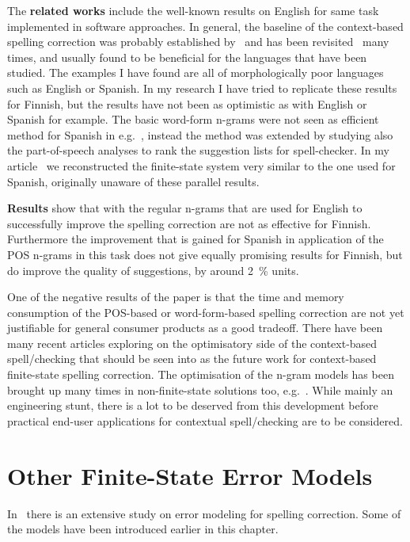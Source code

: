 \documentclass[officiallayout]{unihelcompling}
\begin{document}
The \textbf{related works} include the well-known results on English for same
task implemented in software approaches.  In general, the baseline of the
context-based spelling correction was probably established
by~\citet{mays1991context} and has been
revisited~\citep{wilcox-ohearn2008realword} many times, and usually found to be
beneficial for the languages that have been studied. The examples I have found
are all of morphologically poor languages such as English or Spanish. In my
research I have tried to replicate these results for Finnish, but the results
have not been as optimistic as with English or Spanish for example.  The basic
word-form n-grams were not seen as efficient method for Spanish in
e.g.~\citet{otero2007contextual}, instead the method was extended by studying
also the part-of-speech analyses to rank the suggestion lists for
spell-checker. In my article~ we
reconstructed the finite-state system very similar to the one used for Spanish,
originally unaware of these parallel results.

\textbf{Results} show that with the regular n-grams that are used for English
to successfully improve the spelling correction are not as effective for 
Finnish. Furthermore the improvement that is gained for Spanish in application
of the POS n-grams in this task does not give equally promising results for
Finnish, but do improve the quality of suggestions, by around 2~\% 
units.

One of the negative results of the paper is that the time and memory
consumption of the POS-based or word-form-based spelling correction are not yet
justifiable for general consumer products as a good tradeoff. There have been
many recent articles exploring on the optimisatory side of the context-based
spell\-/checking that should be seen into as the future work for context-based
finite-state spelling correction. The optimisation of the n-gram models has
been brought up many times in non-finite-state solutions too,
e.g.~\citep{church2007compressing}. While mainly an engineering stunt, there is
a lot to be deserved from this development before practical end-user
applications for contextual spell\-/checking are to be considered.

\section{Other Finite-State Error Models}
\label{sec:other-errors}

In~\citet{deorowicz2005correcting} there is an extensive study on error
modeling for spelling correction. Some of the models have been
introduced earlier in this chapter.
\end{document}
